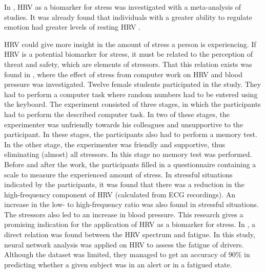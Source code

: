 In \cite{thayer2012meta}, HRV as a biomarker for stress was investigated with a meta-analysis of studies.
It was already found that individuals with a greater ability to regulate emotion had greater levels of resting HRV \cite{appelhans2006heart}.

HRV could give more insight in the amount of stress a person is experiencing.
If HRV is a potential biomarker for stress, it must be related to the perception of threat and safety, which are elements of stressors.
That this relation exists was found in \cite{hjortskov2004effect}, where the effect of stress from computer work on HRV and blood pressure was investigated.
Twelve female students participated in the study. They had to perform a computer task where random numbers had to be entered using the keyboard.
The experiment consisted of three stages, in which the participants had to perform the described computer task.
In two of these stages, the experimenter was unfriendly towards his colleagues and unsupportive to the participant. In these stages, the participants also had to perform a memory test.
In the other stage, the experimenter was friendly and supportive, thus eliminating (almost) all stressors.
In this stage no memory test was performed.
Before and after the work, the participants filled in a questionnaire containing a scale to measure the experienced amount of stress.
In stressful situations indicated by the participants, it was found that there was a reduction in the high-frequency component of HRV (calculated from ECG recordings).
An increase in the low- to high-frequency ratio was also found in stressful situations.
The stressors also led to an increase in blood pressure.
This research gives a promising indication for the application of HRV as a biomarker for stress.
In \cite{patel2011applying}, a direct relation was found between the HRV spectrum and fatigue.
In this study, neural network analysis was applied on HRV to assess the fatigue of drivers.
Although the dataset was limited, they managed to get an accuracy of 90\% in predicting whether a given subject was in an alert or in a fatigued state.

